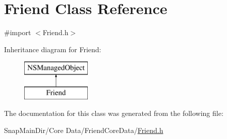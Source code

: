 \hypertarget{interface_friend}{}\section{Friend Class Reference}
\label{interface_friend}


{\ttfamily \#import $<$Friend.\+h$>$}

Inheritance diagram for Friend\+:\begin{figure}[H]
\begin{center}
\leavevmode
\includegraphics[height=2.000000cm]{interface_friend}
\end{center}
\end{figure}


The documentation for this class was generated from the following file\+:\begin{DoxyCompactItemize}
\item 
Snap\+Main\+Dir/\+Core Data/\+Friend\+Core\+Data/\hyperlink{_friend_8h}{Friend.\+h}\end{DoxyCompactItemize}
